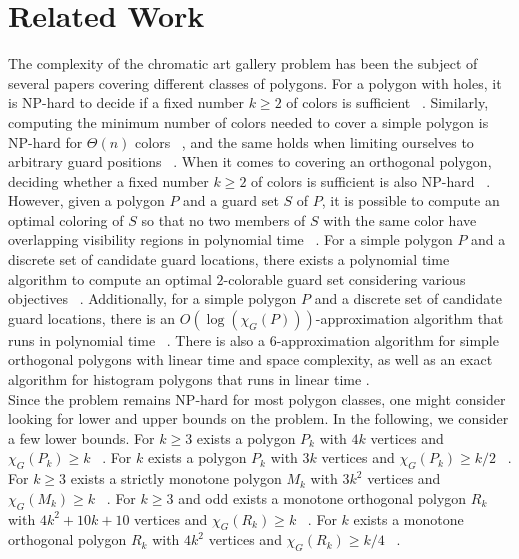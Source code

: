 \section{Related Work}
The complexity of the chromatic art gallery problem has been the subject of several papers covering different classes of polygons.
For a polygon with holes, it is NP-hard to decide if a fixed number $k \geq 2$ of colors is sufficient ~\cite{fekete2014complexity}. Similarly, computing the minimum number of colors needed to cover a simple polygon is NP-hard for $\Theta(n)$ colors ~\cite{fekete2014complexity}, and the same holds when limiting ourselves to arbitrary guard positions ~\cite{fekete2014chromatic}. When it comes to covering an orthogonal polygon, deciding whether a fixed number $k \geq 2$ of colors is sufficient is also NP-hard ~\cite{hoorfar2021np}. However, given a polygon $P$ and a guard set $S$ of $P$, it is possible to compute an optimal coloring of $S$ so that no two members of $S$ with the same color have overlapping visibility regions in polynomial time ~\cite{erickson2011many}. For a simple polygon $P$ and a discrete set of candidate guard locations, there exists a polynomial time algorithm to compute an optimal $2$-colorable guard set considering various objectives ~\cite{fekete2014chromatic}. Additionally, for a simple polygon $P$ and a discrete set of candidate guard locations, there is an $O(\log (\chi_G(P)))$-approximation algorithm that runs in polynomial time ~\cite{fekete2014chromatic}. There is also a $6$-approximation algorithm for simple orthogonal polygons with linear time and space complexity, as well as an exact algorithm for histogram polygons that runs in linear time \cite{hoorfar2021np}.\\
Since the problem remains NP-hard for most polygon classes, one might consider looking for lower and upper bounds on the problem.
In the following, we consider a few lower bounds.
For $k \geq 3$ exists a polygon $P_k$ with $4k$ vertices and $\chi_G(P_k) \geq k$ ~\cite{erickson2012art}.
For $k$ exists a polygon $P_k$ with $3k$ vertices and $\chi_G(P_k) \geq k/2$ ~\cite{bartschi2011coloring}.
For $k \geq 3$ exists a strictly monotone polygon $M_k$ with $3k^2$ vertices and $\chi_G(M_k) \geq k$ ~\cite{erickson2012art}.
For $k \geq 3$ and odd exists a monotone orthogonal polygon $R_k$ with $4k^2 + 10k + 10$ vertices and $\chi_G(R_k) \geq k$ ~\cite{erickson2012art}.
For $k$ exists a monotone orthogonal polygon $R_k$ with $4k^2$ vertices and $\chi_G(R_k) \geq k/4$ ~\cite{bartschi2011coloring}.\\
